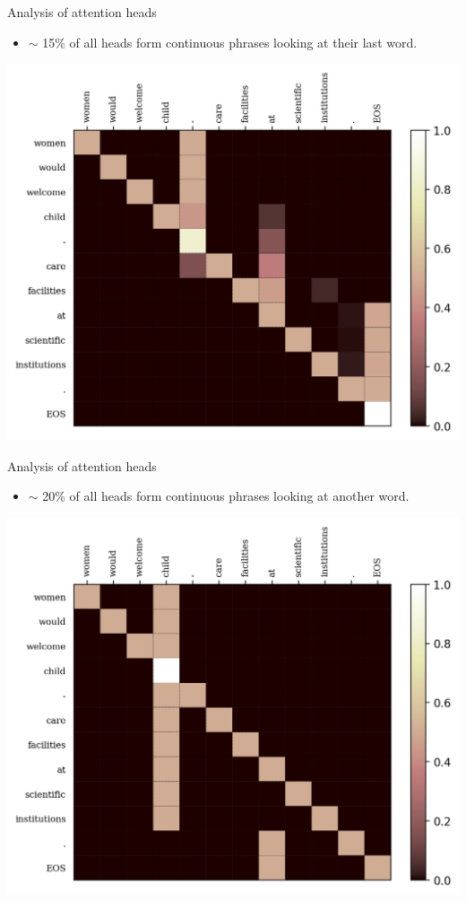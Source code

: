 \documentclass{beamer}
\begin{document}
\begin{frame}{Analysis of attention heads}
    \begin{itemize}
         \item $\sim$ 15\% of all heads form continuous phrases looking at their last word.
    \end{itemize}
    \begin{center}
        \includegraphics[scale=0.5]{look_at_last.png}
    \end{center}
\end{frame}

\begin{frame}{Analysis of attention heads}
    \begin{itemize}
         \item $\sim$ 20\% of all heads form continuous phrases looking at another word.
    \end{itemize}
    \begin{center}
        \includegraphics[scale=0.5]{look_at_another.png}
    \end{center}
\end{frame}
\end{document}
